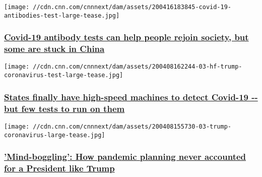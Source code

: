 \texttt{[image: //cdn.cnn.com/cnnnext/dam/assets/200416183845-covid-19-antibodies-test-large-tease.jpg]}

\hypertarget{covid-19-antibody-tests-can-help-people-rejoin-society-but-some-are-stuck-in-china}{%
\subsubsection{\texorpdfstring{\href{/2020/04/17/politics/covid-19-antibody-tests-china/index.html}{Covid-19
antibody tests can help people rejoin society, but some are stuck in
China}}{Covid-19 antibody tests can help people rejoin society, but some are stuck in China}}\label{covid-19-antibody-tests-can-help-people-rejoin-society-but-some-are-stuck-in-china}}

\href{/2020/04/15/politics/coronavirus-rapid-testing-states-abbott-machines-few-tests-invs/index.html}{}

\texttt{[image: //cdn.cnn.com/cnnnext/dam/assets/200408162244-03-hf-trump-coronavirus-test-large-tease.jpg]}

\hypertarget{states-finally-have-high-speed-machines-to-detect-covid-19----but-few-tests-to-run-on-them}{%
\subsubsection{\texorpdfstring{\href{/2020/04/15/politics/coronavirus-rapid-testing-states-abbott-machines-few-tests-invs/index.html}{States
finally have high-speed machines to detect Covid-19 -\/- but few tests
to run on
them}}{States finally have high-speed machines to detect Covid-19 -\/- but few tests to run on them}}\label{states-finally-have-high-speed-machines-to-detect-covid-19----but-few-tests-to-run-on-them}}

\href{/2020/04/14/politics/pandemic-preparedness-trump-invs/index.html}{}

\texttt{[image: //cdn.cnn.com/cnnnext/dam/assets/200408155730-03-trump-coronavirus-large-tease.jpg]}

\hypertarget{mind-boggling-how-pandemic-planning-never-accounted-for-a-president-like-trump}{%
\subsubsection{\texorpdfstring{\href{/2020/04/14/politics/pandemic-preparedness-trump-invs/index.html}{'Mind-boggling':
How pandemic planning never accounted for a President like
Trump}}{'Mind-boggling': How pandemic planning never accounted for a President like Trump}}\label{mind-boggling-how-pandemic-planning-never-accounted-for-a-president-like-trump}}

